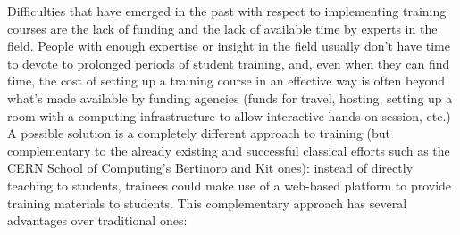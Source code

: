 \documentclass[12pt,a4paper]{article}
\begin{document}
Difficulties that have emerged in the past with respect to implementing training
courses are the lack of funding and the lack of available time by experts in the
field. People with enough expertise or insight in the field usually don't have
time to devote to prolonged periods of student training, and, even when they can
find time, the cost of setting up a training course in an effective way is often
beyond what's made available by funding agencies (funds for travel, hosting,
setting up a room with a computing infrastructure to allow interactive hands-on
session, etc.) A possible solution is a completely different approach to
training (but complementary to the already existing and successful classical
efforts such as the CERN School of Computing's Bertinoro and Kit ones): instead
of directly teaching to students, trainees could make use of a web-based
platform to provide training materials to students. This complementary approach
has several advantages over traditional ones:
\end{document}
